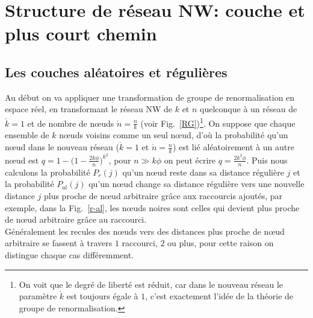 \section{Structure de réseau NW: couche et plus court chemin }

\subsection{Les couches aléatoires et régulières}
Au début on va appliquer une transformation de groupe de renormalisation en espace réel, en transformant le réseau NW de $k$ et $n$ quelconque à un réseau de $\acute{k}=1$ et de nombre de nœuds {$\acute{n}$}$=\frac{n}{k}$ 
(voir Fig.~\ref{RG})\footnote{On voit que le degré de liberté est réduit, car dans le nouveau réseau le paramètre  $\acute{k}$  est toujours égale à $1$, c'est exactement l'idée de la théorie de groupe de renormalisation.}. On suppose que chaque ensemble de $k$ nœuds voisins comme un seul nœud,  d'où la probabilité qu'un
nœud dans le nouveau réseau ($\acute{k}=1$ et $\acute{n}=\frac{n}{k}$) est lié aléatoirement à un autre nœud est $q=1-\big(1-\frac{2k\phi}{n}\big)^{k^2}$, pour $n\gg k\phi$ on peut écrire $q=\frac{2k^3\phi}{n}$. Puis nous calculons la probabilité $P_r(j)$ qu'un nœud reste dans sa distance régulière $j$ et la probabilité $P_{al}(j)$ qu'un nœud change sa distance régulière vers une nouvelle distance $j$ plus proche de nœud arbitraire grâce aux raccourcis ajoutés, par exemple, dans la Fig.~\ref{r-al}, les nœuds noires sont celles qui devient plus proche de nœud arbitraire grâce au raccourci.\\ Généralement les recules des nœuds vers des distances plus
proche de nœud arbitraire se fassent à travers $1$ raccourci, $2$ ou plus, pour cette raison on distingue chaque cas différemment.\\
